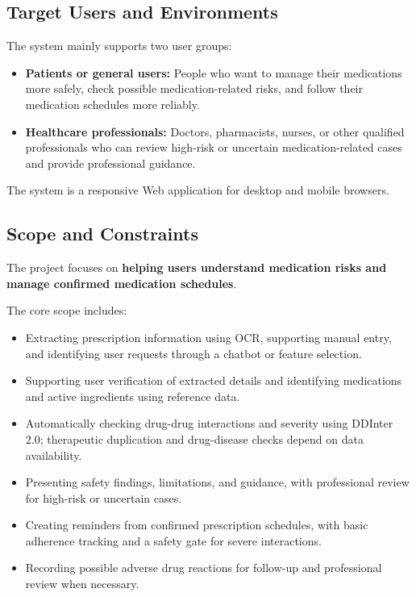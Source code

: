 \subsection{Target Users and Environments}

The system mainly supports two user groups:

\begin{itemize}
    \item \textbf{Patients or general users:}
    People who want to manage their medications more safely, check possible medication-related risks, and follow their medication schedules more reliably.

    \item \textbf{Healthcare professionals:}
    Doctors, pharmacists, nurses, or other qualified professionals who can review high-risk or uncertain medication-related cases and provide professional guidance.
\end{itemize}

The system is a responsive Web application for desktop and mobile browsers.

\subsection{Scope and Constraints}

The project focuses on \textbf{helping users understand medication risks and manage confirmed medication schedules}.

The core scope includes:

\begin{itemize}
    \item Extracting prescription information using OCR, supporting manual entry, and identifying user requests through a chatbot or feature selection.

    \item Supporting user verification of extracted details and identifying medications and active ingredients using reference data.

    \item Automatically checking drug-drug interactions and severity using DDInter 2.0; therapeutic duplication and drug-disease checks depend on data availability.

    \item Presenting safety findings, limitations, and guidance, with professional review for high-risk or uncertain cases.

    \item Creating reminders from confirmed prescription schedules, with basic adherence tracking and a safety gate for severe interactions.

    \item Recording possible adverse drug reactions for follow-up and professional review when necessary.
\end{itemize}


